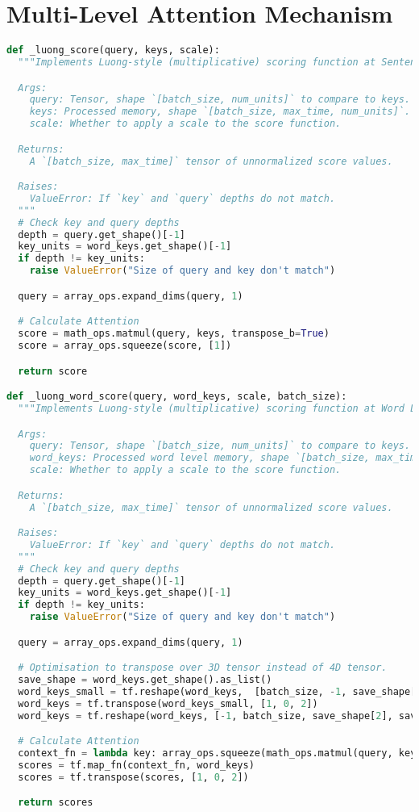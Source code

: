 \section{Multi-Level Attention Mechanism}
\label{code:attn}
\begin{lstlisting}[language=Python]
def _luong_score(query, keys, scale):
  """Implements Luong-style (multiplicative) scoring function at Sentence Level

  Args:
    query: Tensor, shape `[batch_size, num_units]` to compare to keys.
    keys: Processed memory, shape `[batch_size, max_time, num_units]`.
    scale: Whether to apply a scale to the score function.

  Returns:
    A `[batch_size, max_time]` tensor of unnormalized score values.

  Raises:
    ValueError: If `key` and `query` depths do not match.
  """
  # Check key and query depths
  depth = query.get_shape()[-1]
  key_units = word_keys.get_shape()[-1]
  if depth != key_units:
    raise ValueError("Size of query and key don't match")

  query = array_ops.expand_dims(query, 1)

  # Calculate Attention
  score = math_ops.matmul(query, keys, transpose_b=True)
  score = array_ops.squeeze(score, [1])

  return score

def _luong_word_score(query, word_keys, scale, batch_size):
  """Implements Luong-style (multiplicative) scoring function at Word Level

  Args:
    query: Tensor, shape `[batch_size, num_units]` to compare to keys.
    word_keys: Processed word level memory, shape `[batch_size, max_time, num_units]`.
    scale: Whether to apply a scale to the score function.

  Returns:
    A `[batch_size, max_time]` tensor of unnormalized score values.

  Raises:
    ValueError: If `key` and `query` depths do not match.
  """
  # Check key and query depths
  depth = query.get_shape()[-1]
  key_units = word_keys.get_shape()[-1]
  if depth != key_units:
    raise ValueError("Size of query and key don't match")

  query = array_ops.expand_dims(query, 1)

  # Optimisation to transpose over 3D tensor instead of 4D tensor.
  save_shape = word_keys.get_shape().as_list()
  word_keys_small = tf.reshape(word_keys,  [batch_size, -1, save_shape[2]*save_shape[3]])
  word_keys = tf.transpose(word_keys_small, [1, 0, 2])
  word_keys = tf.reshape(word_keys, [-1, batch_size, save_shape[2], save_shape[3]])

  # Calculate Attention
  context_fn = lambda key: array_ops.squeeze(math_ops.matmul(query, key, transpose_b=True), [1])
  scores = tf.map_fn(context_fn, word_keys)
  scores = tf.transpose(scores, [1, 0, 2])

  return scores

\end{lstlisting}